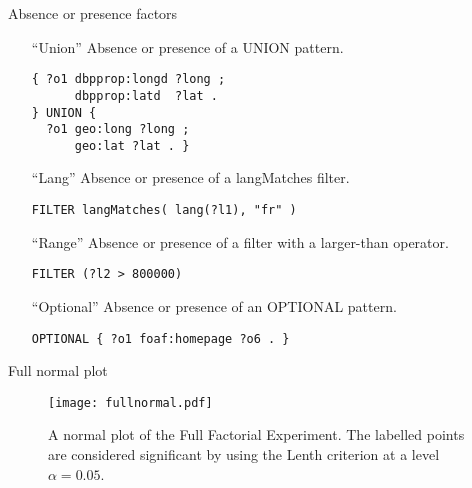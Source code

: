 \documentclass[english,handout,aspectratio=169]{ifislide}
\begin{document}
\begin{frame}[fragile]{Absence or presence factors}
  \begin{itemize}
  \item [``Union''] Absence or presence of a \textsf{UNION} pattern.

    \begin{verbatim}
{ ?o1 dbpprop:longd ?long ;
      dbpprop:latd  ?lat .
} UNION {
  ?o1 geo:long ?long ;
      geo:lat ?lat . }
\end{verbatim} 

  \item [``Lang''] Absence or presence of a \textsf{langMatches}
    filter.

\begin{verbatim}
FILTER langMatches( lang(?l1), "fr" ) 
\end{verbatim} 


  \item [``Range''] Absence or presence of a filter with a larger-than
    operator.

    \begin{verbatim}
FILTER (?l2 > 800000)
\end{verbatim} 

  \item [``Optional''] Absence or presence of an \textsf{OPTIONAL}
    pattern.
    \begin{verbatim}
OPTIONAL { ?o1 foaf:homepage ?o6 . }
\end{verbatim} 

  \end{itemize}
\end{frame}


\begin{frame}{Full normal plot}
\begin{figure}[t]
  \centerline{%
  \texttt{[image: fullnormal.pdf]}}
  \caption{A normal plot of the Full Factorial Experiment. The
    labelled points are considered significant by using the Lenth
    criterion at a level $\alpha=0.05$.}\label{fig:fullnormal}
\end{figure}

\end{frame}
\end{document}
